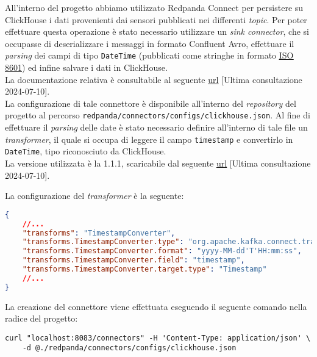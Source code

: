 All'interno del progetto abbiamo utilizzato Redpanda Connect per persistere su ClickHouse i dati provenienti dai sensori pubblicati nei differenti \textit{topic}. Per
poter effettuare questa operazione è stato necessario utilizzare un \textit{sink connector}, che si occupasse di deserializzare i messaggi in formato Confluent Avro, effettuare
il \textit{parsing} dei campi di tipo \texttt{DateTime} (pubblicati come stringhe in formato \href{https://www.iso.org/iso-8601-date-and-time-format.html}{\underline{ISO 8601}})
ed infine salvare i dati in ClickHouse.\\
La documentazione relativa è consultabile al seguente \href{https://clickhouse.com/docs/en/integrations/kafka/clickhouse-kafka-connect-sink}{\underline{url}}
[Ultima consultazione 2024-07-10].\\
La configurazione di tale connettore è disponibile all'interno del \textit{repository} del progetto al percorso \texttt{redpanda/connectors/configs/clickhouse.json}.
Al fine di effettuare il \textit{parsing} delle date è stato necessario definire all'interno di tale file un \textit{transformer}, il quale si occupa di leggere il campo \texttt{timestamp}
e convertirlo in \texttt{DateTime}, tipo riconosciuto da ClickHouse.\\
La versione utilizzata è la 1.1.1, scaricabile dal seguente \href{https://github.com/ClickHouse/clickhouse-kafka-connect/releases}{\underline{url}} [Ultima consultazione 2024-07-10].

La configurazione del \textit{transformer} è la seguente:
\begin{lstlisting}[language=json]
{
    //...
    "transforms": "TimestampConverter",
    "transforms.TimestampConverter.type": "org.apache.kafka.connect.transforms.TimestampConverter$Value",
    "transforms.TimestampConverter.format": "yyyy-MM-dd'T'HH:mm:ss",
    "transforms.TimestampConverter.field": "timestamp",
    "transforms.TimestampConverter.target.type": "Timestamp"
    //...
}
\end{lstlisting}

La creazione del connettore viene effettuata eseguendo il seguente comando nella radice del progetto:
\begin{verbatim}
curl "localhost:8083/connectors" -H 'Content-Type: application/json' \
    -d @./redpanda/connectors/configs/clickhouse.json
\end{verbatim}


